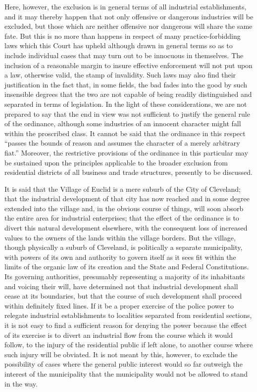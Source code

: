Here, however, the exclusion is in general terms of all industrial
establishments, and it may thereby happen that not only offensive or dangerous
industries will be excluded, but those which are neither offensive nor dangerous
will share the same fate. But this is no more than happens in respect of many
practice-forbidding laws which this Court has upheld although drawn in general
terms so as to include individual cases that may turn out to be innocuous in
themselves. The inclusion of a reasonable margin to insure effective enforcement
will not put upon a law, otherwise valid, the stamp of invalidity. Such laws may
also find their justification in the fact that, in some fields, the bad fades
into the good by such insensible degrees that the two are not capable of being
readily distinguished and separated in terms of legislation. In the light of
these considerations, we are not prepared to say that the end in view was not
sufficient to justify the general rule of the ordinance, although some
industries of an innocent character might fall within the proscribed class. It
cannot be said that the ordinance in this respect ``passes the bounds of reason
and assumes the character of a merely arbitrary fiat.'' Moreover, the
restrictive provisions of the ordinance in this particular may be sustained upon
the principles applicable to the broader exclusion from residential districts of
all business and trade structures, presently to be discussed.

It is said that the Village of Euclid is a mere suburb of the City of Cleveland;
that the industrial development of that city has now reached and in some degree
extended into the village and, in the obvious course of things, will soon absorb
the entire area for industrial enterprises; that the effect of the ordinance is
to divert this natural development elsewhere, with the consequent loss of
increased values to the owners of the lands within the village borders. But the
village, though physically a suburb of Cleveland, is politically a separate
municipality, with powers of its own and authority to govern itself as it sees
fit within the limits of the organic law of its creation and the State and
Federal Constitutions. Its governing authorities, presumably representing a
majority of its inhabitants and voicing their will, have determined not that
industrial development shall cease at its boundaries, but that the course of
such development shall proceed within definitely fixed lines. If it be a proper
exercise of the police power to relegate industrial establishments to localities
separated from residential sections, it is not easy to find a sufficient reason
for denying the power because the effect of its exercise is to divert an
industrial flow from the course which it would follow, to the injury of the
residential public if left alone, to another course where such injury will be
obviated. It is not meant by this, however, to exclude the possibility of cases
where the general public interest would so far outweigh the interest of the
municipality that the municipality would not be allowed to stand in the way.

